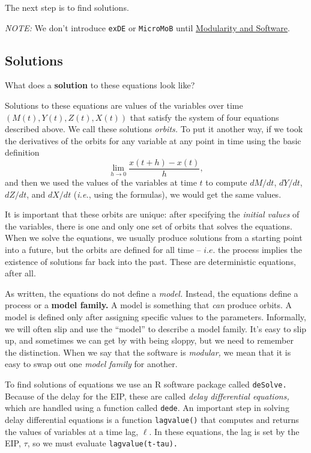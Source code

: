 \documentclass[
]{book}
\begin{document}
The next step is to find solutions.

\emph{NOTE:} We don't introduce \texttt{exDE} or \texttt{MicroMoB} until \hyperref[modularity-and-software]{Modularity and Software}.

\subsection{Solutions}\label{solutions-2}

What does a \textbf{solution} to these equations look like?

Solutions to these equations are values of the variables over time \(\left( M(t), Y(t), Z(t), X(t) \right)\) that satisfy the system of four equations described above. We call these solutions \emph{orbits.} To put it another way, if we took the derivatives of the orbits for any variable at any point in time using the basic definition \[\lim_{h\rightarrow 0} \frac{x(t+h)-x(t)}{h},\] and then we used the values of the variables at time \(t\) to compute \(dM/dt\), \(dY/dt\), \(dZ/dt\), and \(dX/dt\) (\emph{i.e.}, using the formulas), we would get the same values.

It is important that these orbits are unique: after specifying the \emph{initial values} of the variables, there is one and only one set of orbits that solves the equations. When we solve the equations, we usually produce solutions from a starting point into a future, but the orbits are defined for all time -- \(i.e.\) the process implies the existence of solutions far back into the past. These are deterministic equations, after all.

As written, the equations do not define a \emph{model.} Instead, the equations define a process or a \textbf{model family.} A model is something that \emph{can} produce orbits. A model is defined only after assigning specific values to the parameters. Informally, we will often slip and use the ``model'' to describe a model family. It's easy to slip up, and sometimes we can get by with being sloppy, but we need to remember the distinction. When we say that the software is \emph{modular,} we mean that it is easy to swap out one \emph{model family} for another.

To find solutions of equations we use an R software package called \texttt{deSolve.} Because of the delay for the EIP, these are called \emph{delay differential equations,} which are handled using a function called \texttt{dede}. An important step in solving delay differential equations is a function \texttt{lagvalue()} that computes and returns the values of variables at a time lag, \(\ell\). In these equations, the lag is set by the EIP, \(\tau\), so we must evaluate
\texttt{lagvalue(t-tau).}
\end{document}
